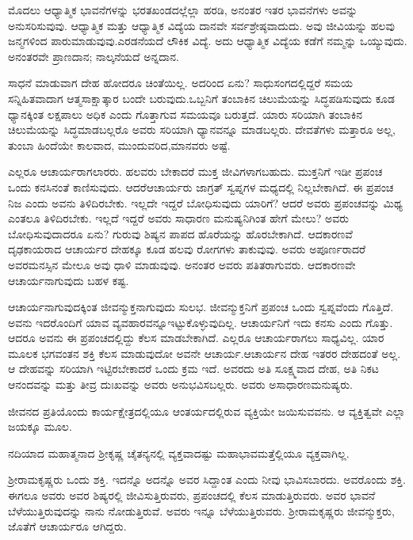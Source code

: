 ಮೊದಲು ಆಧ್ಯಾತ್ಮಿಕ ಭಾವನೆಗಳನ್ನು ಭರತಖಂಡದಲ್ಲೆಲ್ಲಾ ಹರಡಿ, ಅನಂತರ ಇತರ ಭಾವನೆಗಳು ಅವನ್ನು ಅನುಸರಿಸುವುವು. ಆಧ್ಯಾತ್ಮಿಕ ಮತ್ತು ಆಧ್ಯಾತ್ಮಿಕ ವಿದ್ಯೆಯ ದಾನವೇ ಸರ್ವಶ್ರೇಷ್ಠವಾದುದು. ಅವು ಜೀವಿಯನ್ನು ಹಲವು ಜನ್ಮಗಳಿಂದ ಪಾರುಮಾಡುವುವು.\break ಎರಡನೆಯದೆ ಲೌಕಿಕ ವಿದ್ಯೆ. ಅದು ಆಧ್ಯಾತ್ಮಿಕ ವಿದ್ಯೆಯ ಕಡೆಗೆ ನಮ್ಮನ್ನು ಒಯ್ಯುವುದು. ಅನಂತರವೇ ಪ್ರಾಣದಾನ; ನಾಲ್ಕನೆಯದೆ ಅನ್ನದಾನ.

ಸಾಧನೆ ಮಾಡುವಾಗ ದೇಹ ಹೋದರೂ ಚಿಂತೆಯಿಲ್ಲ. ಅದರಿಂದ ಏನು? ಸಾಧು\break ಸಂಗದಲ್ಲಿದ್ದರೆ ಸಮಯ ಸನ್ನಿಹಿತವಾದಾಗ ಆತ್ಮಸಾಕ್ಷಾತ್ಕಾರ ಬಂದೇ ಬರುವುದು.\break ಒಬ್ಬನಿಗೆ ತಂಬಾಕಿನ ಚಿಲುಮೆಯನ್ನು ಸಿದ್ಧಪಡಿಸುವುದು ಕೂಡ ಧ್ಯಾನಕ್ಕಿಂತ ಲಕ್ಷಪಾಲು ಅಧಿಕ ಎಂದು ಗೊತ್ತಾಗುವ ಸಮಯವೂ ಬರುತ್ತದೆ. ಯಾರು ಸರಿಯಾಗಿ ತಂಬಾಕಿನ ಚಿಲುಮೆಯನ್ನು ಸಿದ್ಧಮಾಡಬಲ್ಲರೊ ಅವರು ಸರಿಯಾಗಿ ಧ್ಯಾನವನ್ನೂ ಮಾಡಬಲ್ಲರು. ದೇವತೆಗಳು ಮತ್ತಾರೂ ಅಲ್ಲ, ತುಂಬಾ ಹಿಂದೆಯೇ ಕಾಲವಾದ, ಮುಂದುವರಿದ,\break ಮಾನವರು ಅಷ್ಟೆ.

ಎಲ್ಲರೂ ಆಚಾರ್ಯರಾಗಲಾರರು. ಹಲವರು ಬೇಕಾದರೆ ಮುಕ್ತ ಜೀವಿಗಳಾಗ\-ಬಹುದು. ಮುಕ್ತನಿಗೆ ಇಡೀ ಪ್ರಪಂಚ ಒಂದು ಕನಸಿನಂತೆ ಕಾಣಿಸುವುದು. ಆದರೆ\break ಆಚಾರ್ಯರು ಜಾಗ್ರತ್​ ಸ್ವಪ್ನಗಳ ಮಧ್ಯದಲ್ಲಿ ನಿಲ್ಲಬೇಕಾಗಿದೆ. ಈ ಪ್ರಪಂಚ ನಿಜ ಎಂದು ಅವನು ತಿಳಿದಿರಬೇಕು. ಇಲ್ಲದೇ ಇದ್ದರೆ ಬೋಧಿಸುವುದು ಯಾರಿಗೆ? ಆದರೆ ಅವರು ಪ್ರಪಂಚವನ್ನು ಮಿಥ್ಯ ಎಂತಲೂ ತಿಳಿದಿರಬೇಕು. ಇಲ್ಲದೆ ಇದ್ದರೆ ಅವರು ಸಾಧಾರಣ ಮನುಷ್ಯನಿಗಿಂತ ಹೇಗೆ ಮೇಲು? ಅವರು ಬೋಧಿಸುವುದಾದರೂ ಏನು? ಗುರುವು ಶಿಷ್ಯನ ಪಾಪದ ಹೊರೆಯನ್ನು ಹೊರಬೇಕಾಗಿದೆ. ಆದಕಾರಣವೆ ದೃಢಕಾಯರಾದ ಆಚಾರ್ಯರ ದೇಹಕ್ಕೂ ಕೂಡ ಹಲವು ರೋಗಗಳು ತಾಕುವುವು. ಅವರು ಅಪೂರ್ಣರಾದರೆ ಅವರ\break ಮನಸ್ಸಿನ ಮೇಲೂ ಅವು ಧಾಳಿ ಮಾಡುವುವು. ಅನಂತರ ಅವರು ಪತಿತರಾಗುವರು. ಆದಕಾರಣವೇ ಆಚಾರ್ಯನಾಗುವುದು ಬಹಳ ಕಷ್ಟ.

ಆಚಾರ್ಯನಾಗುವುದಕ್ಕಿಂತ ಜೀವನ್ಮುಕ್ತನಾಗುವುದು ಸುಲಭ. ಜೀವನ್ಮುಕ್ತನಿಗೆ ಪ್ರಪಂಚ ಒಂದು ಸ್ವಪ್ನವೆಂದು ಗೊತ್ತಿದೆ. ಅವನು ಇದರೊಂದಿಗೆ ಯಾವ ವ್ಯವಹಾರವನ್ನೂ\break ಇಟ್ಟುಕೊಳ್ಳುವುದಿಲ್ಲ. ಆಚಾರ್ಯನಿಗೆ ಇದು ಕನಸು ಎಂದು ಗೊತ್ತು. ಆದರೂ ಅವನು ಈ ಪ್ರಪಂಚದಲ್ಲಿದ್ದು ಕೆಲಸ ಮಾಡಬೇಕಾಗಿದೆ. ಎಲ್ಲರೂ ಆಚಾರ್ಯರಾಗಲು ಸಾಧ್ಯವಿಲ್ಲ. ಯಾರ ಮೂಲಕ ಭಗವಂತನ ಶಕ್ತಿ ಕೆಲಸ ಮಾಡುವುದೋ ಅವನೇ ಆಚಾರ್ಯ.\break ಆಚಾರ್ಯನ ದೇಹ ಇತರರ ದೇಹದಂತೆ ಅಲ್ಲ. ಆ ದೇಹವನ್ನು ಸರಿಯಾಗಿ ಇಟ್ಟಿರಬೇಕಾದರೆ ಒಂದು ಕ್ರಮ ಇದೆ. ಅವರದು ಅತಿ ಸೂಕ್ಷ್ಮವಾದ ದೇಹ, ಅತಿ ನಿಕಟ ಆನಂದವನ್ನು ಮತ್ತು ತೀವ್ರ ದುಃಖವನ್ನು ಅವರು ಅನುಭವಿಸಬಲ್ಲರು. ಅವರು ಅಸಾಧಾರಣ\break ಮನುಷ್ಯರು.

ಜೀವನದ ಪ್ರತಿಯೊಂದು ಕಾರ್ಯಕ್ಷೇತ್ರದಲ್ಲಿಯೂ ಆಂತರ್ಯದಲ್ಲಿರುವ ವ್ಯಕ್ತಿಯೇ ಜಯಿಸುವವನು. ಆ ವ್ಯಕ್ತಿತ್ವವೇ ಎಲ್ಲಾ ಜಯಕ್ಕೂ ಮೂಲ.

ನದಿಯಾದ ಮಹಾತ್ಮನಾದ ಶ‍್ರೀಕೃಷ್ಣ ಚೈತನ್ಯನಲ್ಲಿ ವ್ಯಕ್ತವಾದಷ್ಟು ಮಹಾಭಾವ\break ಮತ್ತೆಲ್ಲಿಯೂ ವ್ಯಕ್ತವಾಗಿಲ್ಲ.

ಶ‍್ರೀರಾಮಕೃಷ್ಣರು ಒಂದು ಶಕ್ತಿ. ಇದನ್ನೊ ಅದನ್ನೊ ಅವರ ಸಿದ್ದಾಂತ ಎಂದು ನೀವು ಭಾವಿಸಬಾರದು. ಅವರೊಂದು ಶಕ್ತಿ. ಈಗಲೂ ಅವರು ಅವರ ಶಿಷ್ಯರಲ್ಲಿ ಜೀವಿಸುತ್ತಿರುವರು, ಪ್ರಪಂಚದಲ್ಲಿ ಕೆಲಸ ಮಾಡುತ್ತಿರುವರು. ಅವರ ಭಾವನೆ ಬೆಳೆಯುತ್ತಿರುವುದನ್ನು ನಾನು ನೋಡುತ್ತಿರುವೆ. ಅವರು ಇನ್ನೂ ಬೆಳೆಯುತ್ತಿರುವರು. ಶ‍್ರೀರಾಮಕೃಷ್ಣರು ಜೀವನ್ಮುಕ್ತರು, ಜೊತೆಗೆ ಆಚಾರ್ಯರೂ ಆಗಿದ್ದರು.

